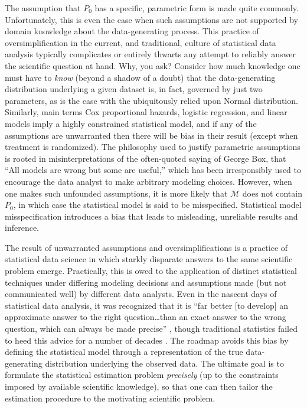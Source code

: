 \documentclass[
  12pt, krantz2,
]{krantz}
\newcommand{\M}{\mathcal{M}}
\newcommand{\1}{\mathbbm{1}}
\theoremstyle{definition}
\theoremstyle{definition}
\theoremstyle{definition}
\theoremstyle{definition}
\theoremstyle{remark}
\begin{document}
The assumption that \(P_0\) has a specific, parametric form is made quite
commonly. Unfortunately, this is even the case when such assumptions are not
supported by domain knowledge about the data-generating process. This practice
of oversimplification in the current, and traditional, culture of statistical
data analysis typically complicates or entirely thwarts any attempt to reliably
answer the scientific question at hand. Why, you ask? Consider how much
knowledge one must have to \emph{know} (beyond a shadow of a doubt) that the
data-generating distribution underlying a given dataset is, in fact, governed by
just two parameters, as is the case with the ubiquitously relied upon Normal
distribution. Similarly, main terms Cox proportional hazards, logistic
regression, and linear models imply a highly constrained statistical model, and
if any of the assumptions are unwarranted then there will be bias in their
result (except when treatment is randomized). The philosophy used to justify
parametric assumptions is rooted in misinterpretations of the often-quoted
saying of George Box, that ``All models are wrong but some are useful,'' which has
been irresponsibly used to encourage the data analyst to make arbitrary modeling
choices. However, when one makes such unfounded assumptions, it is more likely
that \(\M\) does not contain \(P_0\), in which case the statistical model is said to
be misspecified. Statistical model misspecification introduces a bias that leads
to misleading, unreliable results and inference.

The result of unwarranted assumptions and oversimplifications is a practice of
statistical data science in which starkly disparate answers to the same
scientific problem emerge. Practically, this is owed to the application of
distinct statistical techniques under differing modeling decisions and
assumptions made (but not communicated well) by different data analysts. Even in
the nascent days of statistical data analysis, it was recognized that it is ``far
better {[}to develop{]} an approximate answer to the right question\ldots than an exact
answer to the wrong question, which can always be made precise''
\citep{tukey1962future}, though traditional statistics failed to heed this advice for
a number of decades \citep{donoho2017fifty}. The roadmap avoids this bias by defining
the statistical model through a representation of the true data-generating
distribution underlying the observed data. The ultimate goal is to formulate the
statistical estimation problem \emph{precisely} (up to the constraints imposed by
available scientific knowledge), so that one can then tailor the estimation
procedure to the motivating scientific problem.
\end{document}
